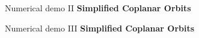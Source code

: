 \documentclass{beamer}
\begin{document}
	\begin{frame}{Numerical demo II}
		\centering
		\textbf{Simplified Coplanar Orbits}
		\vspace{3mm}
		
	\end{frame}
	
	\begin{frame}{Numerical demo III}
		\centering
		\textbf{Simplified Coplanar Orbits}
		\vspace{3mm}
		
	\end{frame}
	
			
\end{document}
